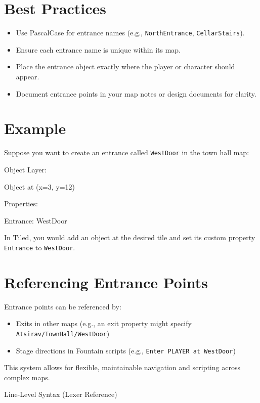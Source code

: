 \documentclass[11pt,letterpaper,oldstylefigures]{memoir}
\makeatletter
\newcommand{\stagedir}[1]{#1\par\vspace{1\baselineskip}}
\newenvironment{FountainExample}
  {\begingroup
  \ttfamily\small
   \setlength{\parindent}{0pt}
  \setlength{\parskip}{0.5em}
  \allowdisplaybreaks
  \setlength{\displaywidowpenalty}{0}
  \setlength{\widowpenalty}{0}
  \setlength{\clubpenalty}{0}
  \setlength{\interlinepenalty}{0}
}
  {\endgroup}
\let\oldchapter\chapter
\def\chapter{%
  \@ifstar
    {\FountainScripting@starchapter}%
    {\@dblarg\FountainScripting@chapter}}
\def\FountainScripting@starchapter#1{\oldchapter*{#1}\chaptermark{#1}}
\def\FountainScripting@chapter[#1]#2{\oldchapter[#1]{#2}\chaptermark{#2}}
\makeatother
\begin{document}
\section{Best Practices}
\begin{itemize}
  \item Use PascalCase for entrance names (e.g., \texttt{NorthEntrance}, \texttt{CellarStairs}).
  \item Ensure each entrance name is unique within its map.
  \item Place the entrance object exactly where the player or character should appear.
  \item Document entrance points in your map notes or design documents for clarity.
\end{itemize}

\section{Example}
Suppose you want to create an entrance called \texttt{WestDoor} in the town hall map:
\begin{FountainExample}
\stagedir{Object Layer:}
\stagedir{  Object at (x=3, y=12)}
\stagedir{    Properties:}
\stagedir{      Entrance: WestDoor}
\end{FountainExample}

In Tiled, you would add an object at the desired tile and set its custom property \texttt{Entrance} to \texttt{WestDoor}.

\section{Referencing Entrance Points}
Entrance points can be referenced by:
\begin{itemize}
  \item Exits in other maps (e.g., an exit property might specify \texttt{Atsirav/TownHall/WestDoor})
  \item Stage directions in Fountain scripts (e.g., \texttt{Enter PLAYER at WestDoor})
\end{itemize}

This system allows for flexible, maintainable navigation and scripting across complex maps.

\backmatter

\appendix

\chapter{Line-Level Syntax (Lexer Reference)}
\label{app:lexer-syntax}
\end{document}
